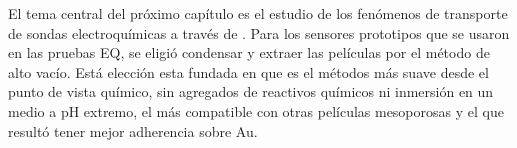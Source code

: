 
	El tema central del próximo capítulo es el estudio de los fenómenos de transporte de sondas electroquímicas a través de \pdm. Para los sensores prototipos que se usaron en las pruebas EQ, se eligió condensar y extraer las películas por el método de alto vacío. Está elección esta fundada en que es el métodos más suave desde el punto de vista químico, sin agregados de reactivos químicos ni inmersión en un medio a pH extremo, el más compatible con otras películas mesoporosas y el que resultó tener mejor adherencia sobre Au. 			 

	



	


